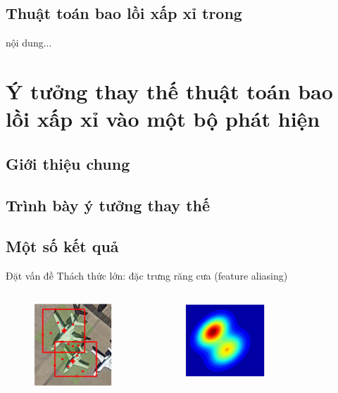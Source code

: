 \documentclass[11pt]{beamer}
\theoremstyle{definition}
\theoremstyle{plain}
\theoremstyle{plain}
\theoremstyle{remark}
\begin{document}
	\subsection{Thuật toán bao lồi xấp xỉ trong}
	
	\begin{frame}
		nội dung...
	\end{frame}
	\section{Ý tưởng thay thế thuật toán bao lồi xấp xỉ vào một bộ phát hiện}
	\subsection{Giới thiệu chung}
	
	\subsection{Trình bày ý tưởng thay thế}
	
	\subsection{Một số kết quả}
	
	\begin{frame}{Đặt vấn đề}
			Thách thức lớn: đặc trưng răng cưa (feature aliasing)
			\begin{columns}[c] %
			\begin{figure}
				\centering
				\includegraphics[width=3cm]{reppoint_bouding_box.jpg}
		
			\end{figure}
			\begin{figure}
				\centering
				\includegraphics[width=3cm]{reception_field_w_aliasing.jpg}
			
			\end{figure}
		\end{columns}
	\end{frame}
	
\end{document}
